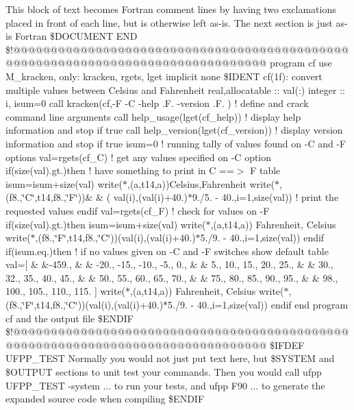 This block of text becomes Fortran comment lines by having two exclamations placed in front of each line, but is otherwise left as-\/is. The next section is just as-\/is Fortran \$\+D\+O\+C\+U\+M\+E\+N\+T E\+N\+D \$!@@@@@@@@@@@@@@@@@@@@@@@@@@@@@@@@@@@@@@@@@@@@@@@@@@@@@@@@@@@@@@@@@@@@@@@@@@@@@@@@ program cf use M\+\_\+kracken, only\+: kracken, rgets, lget implicit none \$\+I\+D\+E\+N\+T cf(1f)\+: convert multiple values between Celsius and Fahrenheit real,allocatable \+:: val(\+:) integer \+:: i, isum=0 call kracken(\textquotesingle{}cf\textquotesingle{},\textquotesingle{}-\/\+F -\/\+C -\/help .\+F. -\/version .\+F.\textquotesingle{} ) ! define and crack command line arguments call help\+\_\+usage(lget(\textquotesingle{}cf\+\_\+help\textquotesingle{})) ! display help information and stop if true call help\+\_\+version(lget(\textquotesingle{}cf\+\_\+version\textquotesingle{})) ! display version information and stop if true isum=0 ! running tally of values found on -\/\+C and -\/\+F options val=rgets(\textquotesingle{}cf\+\_\+\+C\textquotesingle{}) ! get any values specified on -\/\+C option if(size(val).\+gt.)then ! have something to print in C ==$>$ F table isum=isum+size(val) write($\ast$,\textquotesingle{}(a,t14,a)\textquotesingle{})\textquotesingle{}\+Celsius\textquotesingle{},\textquotesingle{}\+Fahrenheit\textquotesingle{} write($\ast$,\textquotesingle{}(f8.,\char`\"{}\+C\char`\"{},t14,f8.,\char`\"{}\+F\char`\"{})\textquotesingle{})\& \& ( val(i),(val(i)+40.)$\ast$9./5. -\/ 40.,i=1,size(val)) ! print the requested values endif val=rgets(\textquotesingle{}cf\+\_\+\+F\textquotesingle{}) ! check for values on -\/\+F if(size(val).\+gt.)then isum=isum+size(val) write($\ast$,\textquotesingle{}(a,t14,a)\textquotesingle{}) \textquotesingle{}\+Fahrenheit\textquotesingle{}, \textquotesingle{}\+Celsius\textquotesingle{} write($\ast$,\textquotesingle{}(f8.,\char`\"{}\+F\char`\"{},t14,f8.,\char`\"{}\+C\char`\"{})\textquotesingle{})(val(i),(val(i)+40.)$\ast$5./9. -\/ 40.,i=1,size(val)) endif if(isum.\+eq.)then ! if no values given on -\/\+C and -\/\+F switches show default table val=\mbox{[} \& \&-\/459., \& \& -\/20., -\/15., -\/10., -\/5., 0., \& \& 5., 10., 15., 20., 25., \& \& 30., 32., 35., 40., 45., \& \& 50., 55., 60., 65., 70., \& \& 75., 80., 85., 90., 95., \& \& 98., 100., 105., 110., 115. \mbox{]} write($\ast$,\textquotesingle{}(a,t14,a)\textquotesingle{}) \textquotesingle{}\+Fahrenheit\textquotesingle{}, \textquotesingle{}\+Celsius\textquotesingle{} write($\ast$,\textquotesingle{}(f8.,\char`\"{}\+F\char`\"{},t14,f8.,\char`\"{}\+C\char`\"{})\textquotesingle{})(val(i),(val(i)+40.)$\ast$5./9. -\/ 40.,i=1,size(val)) endif end program cf and the output file \$\+E\+N\+D\+I\+F \$!@@@@@@@@@@@@@@@@@@@@@@@@@@@@@@@@@@@@@@@@@@@@@@@@@@@@@@@@@@@@@@@@@@@@@@@@@@@@@@@@ \$\+I\+F\+D\+E\+F U\+F\+P\+P\+\_\+\+T\+E\+S\+T Normally you would not just put text here, but \$\+S\+Y\+S\+T\+E\+M and \$\+O\+U\+T\+P\+U\+T sections to unit test your commands. Then you would call ufpp U\+F\+P\+P\+\_\+\+T\+E\+S\+T -\/system ... to run your tests, and ufpp F90 ... to generate the expanded source code when compiling \$\+E\+N\+D\+I\+F 